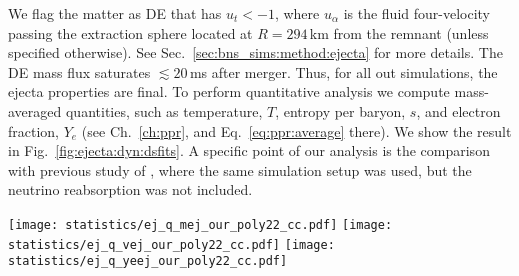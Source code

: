 We flag the matter as \ac{DE} that has $u_t < -1$, where $u_{\alpha}$ is the 
fluid four-velocity passing the extraction sphere located at $R=294\,$km 
from the remnant (unless specified otherwise).
See Sec.~\ref{sec:bns_sims:method:ejecta} for more details.
%
The \ac{DE} mass flux saturates ${\lesssim}20\,$ms after merger.
Thus, for all out simulations, the ejecta properties are final.
%
To perform quantitative analysis we compute mass-averaged quantities, such 
as temperature, $T$, entropy per baryon, $s$, and electron fraction, $Y_e$ 
(see Ch.~\ref{ch:ppr}, and Eq.~\ref{eq:ppr:average} there).
%
We show the result in Fig.~\ref{fig:ejecta:dyn:dsfits}.
A specific point of our analysis is the comparison with previous study of 
\citet{Radice:2018pdn}, where the same simulation setup was used, but 
the neutrino reabsorption was not included.
%
\begin{figure*}[t]
    \centering 
    \texttt{[image: statistics/ej\_q\_mej\_our\_poly22\_cc.pdf]}
    \texttt{[image: statistics/ej\_q\_vej\_our\_poly22\_cc.pdf]}
    \texttt{[image: statistics/ej\_q\_yeej\_our\_poly22\_cc.pdf]}
    \caption{Dynamical ejecta properties as a function of mass ratio
        and reduced tidal parameter. The dependency on the latter is
        color coded. From left to right the main panels show the total
        mass, the mass-averaged velocity and the electron fraction.
        The bottom panels show the relative difference between the data
        and the fit polynomial fit discussed in the text.
        (Adapted from \citet{Nedora:2020pak})
    }
    \label{fig:ejecta:dyn:dsfits}
\end{figure*}
%





